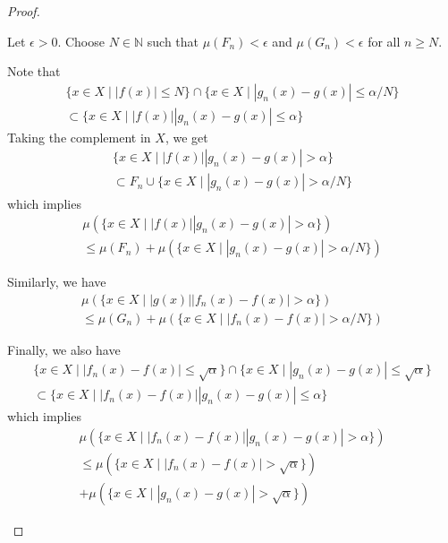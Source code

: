 \documentclass[11pt,a4paper,twoside]{article}
\theoremstyle{definition}
\begin{document}
\begin{proof}
\begin{enumerate}[(a)]
  Let $\epsilon > 0$. Choose $N \in \mathbb{N}$ such that $\mu ( F_n ) < \epsilon$ and $\mu ( G_n ) < \epsilon$ for all $n \geq N$.

  Note that
  \begin{multline*}
    \big\{ x \in X \mid | f (x) | \leq N \big\} \cap \big\{ x \in X \mid | g_n (x) - g (x) | \leq \alpha / N \big\} \\
    \subset \big\{ x \in X \mid | f (x) | | g_n (x) - g (x) | \leq \alpha \big\}
  \end{multline*}
  Taking the complement in $X$, we get
  \begin{multline*}
    \big\{ x \in X \mid | f (x) | | g_n (x) - g (x) | > \alpha \big\} \\
    \subset F_n \cup \big\{ x \in X \mid | g_n (x) - g (x) | > \alpha / N \big\}
  \end{multline*}
  which implies
  \begin{multline*}
    \mu \left( \big\{ x \in X \mid | f (x) | | g_n (x) - g (x) | > \alpha \big\} \right) \\
    \leq \mu (F_n) + \mu \left( \big\{ x \in X \mid | g_n (x) - g (x) | > \alpha / N \big\} \right)
  \end{multline*}

  Similarly, we have
  \begin{multline*}
    \mu \left( \big\{ x \in X \mid | g (x) | | f_n (x) - f (x) | > \alpha \big\} \right) \\
    \leq \mu (G_n) + \mu \left( \big\{ x \in X \mid | f_n (x) - f (x) | > \alpha / N \big\} \right)
  \end{multline*}

  Finally, we also have
  \begin{multline*}
    \big\{ x \in X \mid | f_n (x) - f (x) | \leq \sqrt{\alpha} \big\} \cap \big\{ x \in X \mid | g_n (x) - g (x) | \leq \sqrt{\alpha} \big\} \\
    \subset \big\{ x \in X \mid | f_n (x) - f (x) | | g_n (x) - g (x) | \leq \alpha \big\}
  \end{multline*}
  which implies
  \begin{multline*}
    \mu \left( \big\{ x \in X \mid | f_n (x) - f (x) | | g_n (x) - g (x) | > \alpha \big\} \right) \\
    \leq \mu \left( \big\{ x \in X \mid | f_n (x) - f (x) | > \sqrt{\alpha} \big\} \right) \\
    + \mu \left( \big\{ x \in X \mid | g_n (x) - g (x) | > \sqrt{\alpha} \big\} \right)
  \end{multline*}


\end{enumerate}
\end{proof}
\end{document}
